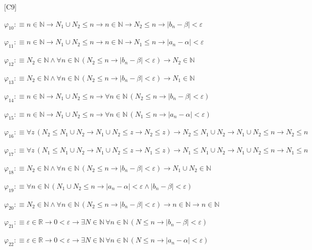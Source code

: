 \begin{fullproof}{[C9]}
\begin{abbrevlist}
\item $\varphi_{10} :\equiv n \in \mathbb{N} \to N_{1} \cup N_{2} \leq n \to n \in \mathbb{N} \to N_{2} \leq n \to \lvert b_{n} - \beta \rvert < \varepsilon$
\item $\varphi_{11} :\equiv n \in \mathbb{N} \to N_{1} \cup N_{2} \leq n \to n \in \mathbb{N} \to N_{1} \leq n \to \lvert a_{n} - \alpha \rvert < \varepsilon$
\item $\varphi_{12} :\equiv N_{2} \in \mathbb{N} \land \forall n \in \mathbb{N}\,(N_{2} \leq n \to \lvert b_{n} - \beta \rvert < \varepsilon) \to N_{2} \in \mathbb{N}$
\item $\varphi_{13} :\equiv N_{2} \in \mathbb{N} \land \forall n \in \mathbb{N}\,(N_{2} \leq n \to \lvert b_{n} - \beta \rvert < \varepsilon) \to N_{1} \in \mathbb{N}$
\item $\varphi_{14} :\equiv n \in \mathbb{N} \to N_{1} \cup N_{2} \leq n \to \forall n \in \mathbb{N}\,(N_{2} \leq n \to \lvert b_{n} - \beta \rvert < \varepsilon)$
\item $\varphi_{15} :\equiv n \in \mathbb{N} \to N_{1} \cup N_{2} \leq n \to \forall n \in \mathbb{N}\,(N_{1} \leq n \to \lvert a_{n} - \alpha \rvert < \varepsilon)$
\item $\varphi_{16} :\equiv \forall z\,(N_{2} \leq N_{1} \cup N_{2} \to N_{1} \cup N_{2} \leq z \to N_{2} \leq z) \to N_{2} \leq N_{1} \cup N_{2} \to N_{1} \cup N_{2} \leq n \to N_{2} \leq n$
\item $\varphi_{17} :\equiv \forall z\,(N_{1} \leq N_{1} \cup N_{2} \to N_{1} \cup N_{2} \leq z \to N_{1} \leq z) \to N_{1} \leq N_{1} \cup N_{2} \to N_{1} \cup N_{2} \leq n \to N_{1} \leq n$
\item $\varphi_{18} :\equiv N_{2} \in \mathbb{N} \land \forall n \in \mathbb{N}\,(N_{2} \leq n \to \lvert b_{n} - \beta \rvert < \varepsilon) \to N_{1} \cup N_{2} \in \mathbb{N}$
\item $\varphi_{19} :\equiv \forall n \in \mathbb{N}\,(N_{1} \cup N_{2} \leq n \to \lvert a_{n} - \alpha \rvert < \varepsilon \land \lvert b_{n} - \beta \rvert < \varepsilon)$
\item $\varphi_{20} :\equiv N_{2} \in \mathbb{N} \land \forall n \in \mathbb{N}\,(N_{2} \leq n \to \lvert b_{n} - \beta \rvert < \varepsilon) \to n \in \mathbb{N} \to n \in \mathbb{N}$
\item $\varphi_{21} :\equiv \varepsilon \in \mathbb{R} \to 0 < \varepsilon \to \exists N \in \mathbb{N}\,\forall n \in \mathbb{N}\,(N \leq n \to \lvert b_{n} - \beta \rvert < \varepsilon)$
\item $\varphi_{22} :\equiv \varepsilon \in \mathbb{R} \to 0 < \varepsilon \to \exists N \in \mathbb{N}\,\forall n \in \mathbb{N}\,(N \leq n \to \lvert a_{n} - \alpha \rvert < \varepsilon)$

\end{abbrevlist}
\end{fullproof}
